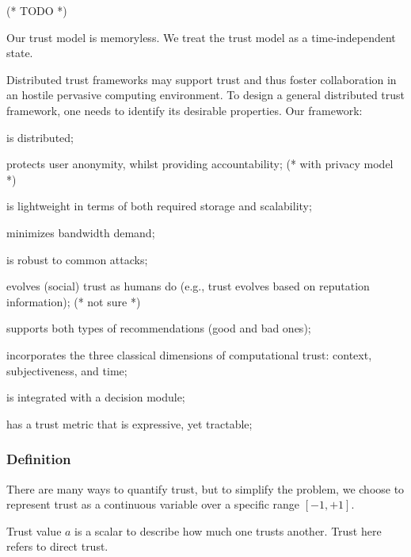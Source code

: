 \documentclass{article}
\begin{document}
(* TODO *)



Our trust model is memoryless. We treat the trust model as a time-independent state.



Distributed trust frameworks may support trust and thus foster collaboration in an hostile pervasive computing environment. To design a general distributed
trust framework, one needs to identify its desirable properties. Our framework:


\item is distributed;


\item protects user anonymity, whilst providing accountability; (* with privacy model *)


\item is lightweight in terms of both required storage and scalability;


\item minimizes bandwidth demand;


\item is robust to common attacks;


\item evolves (social) trust as humans do (e.g., trust evolves based on reputation information); (* not sure *)


\item supports both types of recommendations (good and bad ones);


\item incorporates the three classical dimensions of computational trust: context, subjectiveness, and time;


\item is integrated with a decision module;


\item has a trust metric that is expressive, yet tractable;


\subsubsection{Definition}





There are many ways to quantify trust, but to simplify the problem, we choose to represent trust as a continuous variable over a specific range \([-1,
+1]\).

Trust value \(a\) is a scalar to describe how much one trusts another. Trust here refers to direct trust.
\end{document}
